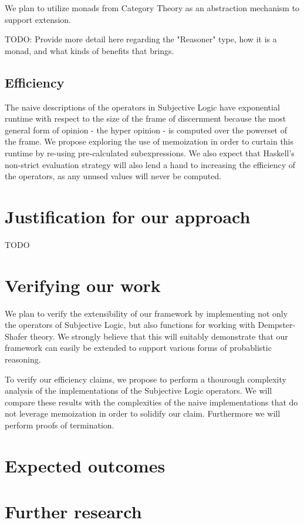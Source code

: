 \documentclass[a4paper]{article}
\begin{document}
\par
We plan to utilize monads from Category Theory as an abstraction mechanism to support
extension. 

\par
TODO: Provide more detail here regarding the "Reasoner" type, how it is a monad, and
what kinds of benefits that brings.

\subsection{Efficiency}

\par
The naive descriptions of the operators in Subjective Logic have exponential runtime with respect
to the size of the frame of discernment because the most general form of opinion - the hyper
opinion - is computed over the powerset of the frame. We propose exploring the use of memoization
in order to curtain this runtime by re-using pre-calculated subexpressions.
We also expect that Haskell's non-strict evaluation strategy will also lend a hand to
increasing the efficiency of the operators, as any unused values will never be computed.

\section{Justification for our approach}

\par
TODO

\section{Verifying our work}

\par
We plan to verify the extensibility of our framework by implementing not only the
operators of Subjective Logic, but also functions for working with Dempster-Shafer
theory. We strongly believe that this will suitably demonstrate that our framework can
easily be extended to support various forms of probablistic reasoning.

\par
To verify our efficiency claims, we propose to perform a thourough complexity analysis
of the implementations of the Subjective Logic operators. We will compare these results
with the complexities of the naive implementations that do not leverage memoization in
order to solidify our claim. Furthermore we will perform proofs of termination.

\section{Expected outcomes}

\section{Further research}
\end{document}
